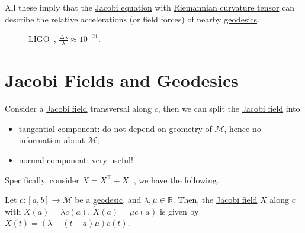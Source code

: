 All these imply that the \hyperref[eq:Jacobi]{Jacobi equation} with \hyperref[def:Riemannian-curvature]{Riemannian curvature tensor} can describe the relative accelerations (or field forces) of nearby \hyperref[def:geodesic]{geodesics}.
\begin{figure}[H]
	\centering
	\caption{LIGO~\cite{PhysRevLett.116.061102}, \(\frac{\Delta \lambda }{\lambda } \approx 10^{-21}\).}
	\label{fig:LIGO}
\end{figure}

\section{Jacobi Fields and Geodesics}

Consider a \hyperref[def:Jacobi-field]{Jacobi field} transversal along \(c\), then we can split the \hyperref[def:Jacobi-field]{Jacobi field} into
\begin{itemize}
	\item tangential component: do not depend on geometry of \(\mathcal{M} \), hence no information about \(\mathcal{M} \);
	\item normal component: very useful!
\end{itemize}
Specifically, consider \(X = X^{\top} + X^{\perp} \), we have the following.

\begin{lemma}
	Let \(c\colon [a, b] \to \mathcal{M} \) be a \hyperref[def:geodesic]{geodesic}, and \(\lambda , \mu \in \mathbb{R} \). Then, the \hyperref[def:Jacobi-field]{Jacobi field} \(X\) along \(c\) with \(X(a) = \lambda \dot{c} (a)\), \(\dot{X} (a) = \mu \dot{c} (a)\) is given by \(X(t) = (\lambda + (t-a)\mu )\dot{c}(t)\).
\end{lemma}